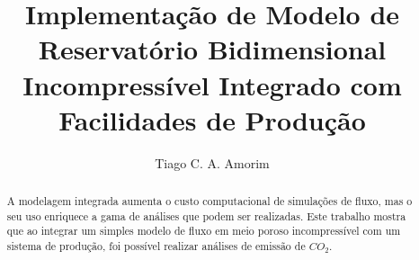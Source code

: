 \documentclass[final,5p]{elsarticle}
\numberwithin{equation}{section}
\begin{document}
\begin{frontmatter}



\title{Implementação de Modelo de Reservatório Bidimensional Incompressível Integrado com Facilidades de Produção}


\author{Tiago C. A. Amorim}

\begin{abstract}

    A modelagem integrada aumenta o custo computacional de simulações de fluxo, mas o seu uso enriquece a gama de análises que podem ser realizadas. Este trabalho mostra que ao integrar um simples modelo de fluxo em meio poroso incompressível com um sistema de produção, foi possível realizar análises de emissão de $CO_2$.


\end{abstract}
\end{frontmatter}
\end{document}
